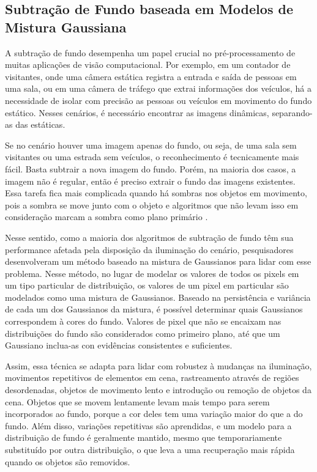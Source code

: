 \documentclass[12pt, %
openright, 
oneside, %
a4paper,    %
brazil]{facom-ufu-abntex2}
\begin{document}
\subsection{Subtração de Fundo baseada em Modelos de Mistura Gaussiana}

A subtração de fundo desempenha um papel crucial no pré-processamento de muitas
aplicações de visão computacional. Por exemplo, em um contador de visitantes,
onde uma câmera estática registra a entrada e saída de pessoas em uma sala, ou
em uma câmera de tráfego que extrai informações dos veículos, há a necessidade
de isolar com precisão as pessoas ou veículos em movimento do fundo estático.
Nesses cenários, é necessário encontrar as imagens dinâmicas, separando-as das
estáticas.

Se no cenário houver uma imagem apenas do fundo, ou seja, de uma sala sem
visitantes ou uma estrada sem veículos, o reconhecimento é tecnicamente mais
fácil. Basta subtrair a nova imagem do fundo. Porém, na maioria dos casos, a
imagem não é regular, então é preciso extrair o fundo das imagens existentes.
Essa tarefa fica mais complicada quando há sombras nos objetos em movimento,
pois a sombra se move junto com o objeto e algoritmos que não levam isso em
consideração marcam a sombra como plano primário \cite{opencv_bgsubtraction}.

Nesse sentido, como a maioria dos algoritmos de subtração de fundo têm sua
performance afetada pela disposição da iluminação do cenário, pesquisadores
desenvolveram um método baseado na mistura de Gaussianos para lidar com esse
problema. Nesse método, no lugar de modelar os valores de todos os pixels em um
tipo particular de distribuição, os valores de um pixel em particular são
modelados como uma mistura de Gaussianos. Baseado na persistência e variância
de cada um dos Gaussianos da mistura, é possível determinar quais Gaussianos
correspondem à cores do fundo. Valores de pixel que não se encaixam nas
distribuições do fundo são considerados como primeiro plano, até que um
Gaussiano inclua-as con evidências consistentes e suficientes.

Assim, essa técnica se adapta para lidar com robustez à mudanças na iluminação,
movimentos repetitivos de elementos em cena, rastreamento através de regiões
desordenadas, objetos de movimento lento e introdução ou remoção de objetos da
cena. Objetos que se movem lentamente levam mais tempo para serem incorporados
ao fundo, porque a cor deles tem uma variação maior do que a do fundo. Além
disso, variações repetitivas são aprendidas, e um modelo para a distribuição de
fundo é geralmente mantido, mesmo que temporariamente substituído por outra
distribuição, o que leva a uma recuperação mais rápida quando os objetos são
removidos. \cite{784637}
\end{document}
